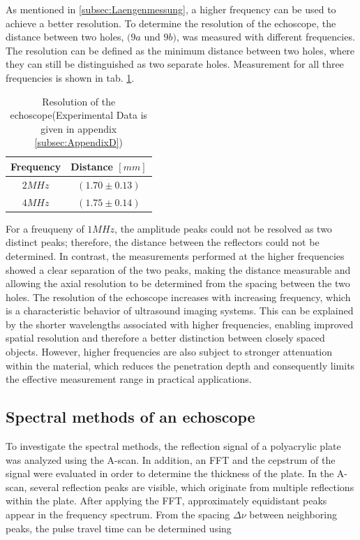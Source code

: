     As mentioned in \ref{subsec:Laengenmessung}, a higher frequency can be used to achieve a better resolution. To determine the resolution of the echoscope, the distance between two holes, 
    $(9a$ und $9b)$, was measured with different frequencies. The resolution can be defined as the minimum distance between two holes, where they can still be distinguished as two separate holes. 
    Measurement for all three frequencies is shown in tab. \ref{tab:Resolution}.
    
    \begin{table}[H]
        \centering
        \begin{tabular}{|c|c|}
        \hline
        Frequency & Distance $[mm]$\\
        \hline
        $2MHz$ & $(1.70 \pm 0.13)$ \\
        \hline
        $4MHz$ & $(1.75 \pm 0.14)$ \\
        \hline
        \end{tabular}
        \caption{Resolution of the echoscope(Experimental Data is given in appendix \ref{subsec:AppendixD})}
        \label{tab:Resolution}
    \end{table}
    \noindent
    For a freuqueny of $1MHz$, the amplitude peaks could not be resolved as two distinct peaks; therefore, the distance between the reflectors could not be determined. In contrast, the measurements 
    performed at the higher frequencies showed a clear separation of the two peaks, making the distance measurable and allowing the axial resolution to be determined from the spacing 
    between the two holes.
    The resolution of the echoscope increases with increasing frequency, which is a characteristic behavior of ultrasound imaging systems. This can be explained by the shorter wavelengths associated 
    with higher frequencies, enabling improved spatial resolution and therefore a better distinction between closely spaced objects. However, higher frequencies are also subject to stronger 
    attenuation within the material, which reduces the penetration depth and consequently limits the effective measurement range in practical applications.
    
    
    \subsection{Spectral methods of an echoscope} \label{subsec:SpectraleMethoden}

    To investigate the spectral methods, the reflection signal of a polyacrylic plate was analyzed using the A-scan. In addition, an FFT and the cepstrum of the signal were evaluated in order to 
    determine the thickness of the plate.
    \noindent
    In the A-scan, several reflection peaks are visible, which originate from multiple reflections within the plate. After applying the FFT, approximately equidistant peaks appear in the frequency 
    spectrum. From the spacing $\Delta \nu$ between neighboring peaks, the pulse travel time can be determined using

